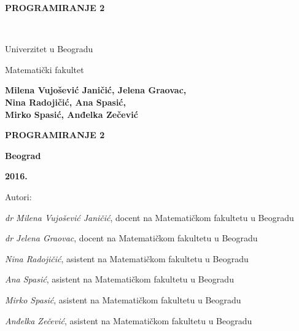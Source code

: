 \pagestyle{empty}

\vspace*{20pt}
\centerline{{\large\bfseries PROGRAMIRANJE 2} \vspace*{2mm}}
\newpage
\verb" "
\newpage
\begin{center}
{\sffamily

{\fontsize{16pt}{19pt}\selectfont Univerzitet u Beogradu}

{\fontsize{16pt}{19pt}\selectfont Matematički fakultet}
\vspace{70pt}

{\fontsize{16pt}{19pt}\selectfont \bfseries  Milena Vujošević Janičić, Jelena Graovac,\\ Nina Radojičić, Ana Spasić,\\ \vspace*{1.5mm} Mirko Spasić, Anđelka Zečević}

\vspace{50pt}
\centerline{{\huge\bfseries PROGRAMIRANJE 2} \vspace*{2mm}}
\centerline{{\huge\bfseries {\fontsize{22pt}{26pt}\selectfont {Zbirka zadataka sa rešenjima}}}}


\vspace{120pt}

\centerline{{\Large \bfseries Beograd}}
\centerline{{\Large \bfseries 2016.}}

}
\end{center}



\newpage
\normalsize

\noindent
Autori: 

\noindent
{\slshape dr Milena Vujošević Janičić}, docent na Matematičkom fakultetu u Beogradu

\noindent
{\slshape dr Jelena Graovac}, docent na Matematičkom fakultetu u Beogradu

\noindent
{\slshape Nina Radojičić}, asistent na Matematičkom fakultetu u Beogradu

\noindent
{\slshape Ana Spasić}, asistent na Matematičkom fakultetu u Beogradu

\noindent
{\slshape Mirko Spasić}, asistent na Matematičkom fakultetu u Beogradu

\noindent
{\slshape Anđelka Zečević}, asistent na Matematičkom fakultetu u Beogradu
\vspace*{2mm}

